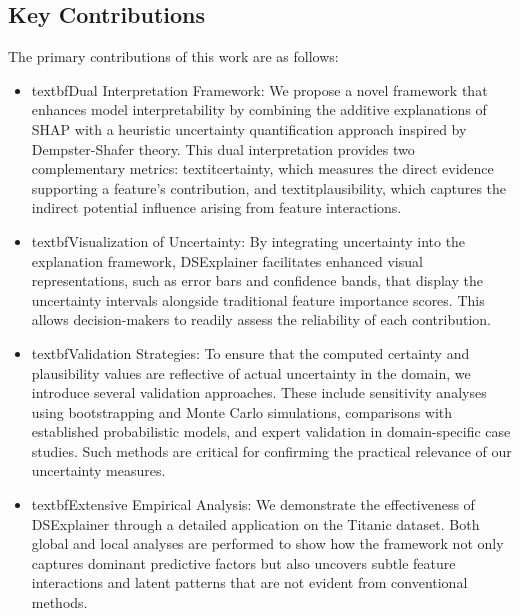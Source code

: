 \documentclass[acmlarge]{acmart}
\begin{document}
\subsection{Key Contributions}
The primary contributions of this work are as follows:
\begin{itemize}
    \item textbf{Dual Interpretation Framework:} We propose a novel framework that enhances model interpretability by combining the additive explanations of SHAP with a heuristic uncertainty quantification approach inspired by Dempster-Shafer theory. This dual interpretation provides two complementary metrics: textit{certainty}, which measures the direct evidence supporting a feature's contribution, and textit{plausibility}, which captures the indirect potential influence arising from feature interactions.

    \item textbf{Visualization of Uncertainty:} By integrating uncertainty into the explanation framework, DSExplainer facilitates enhanced visual representations, such as error bars and confidence bands, that display the uncertainty intervals alongside traditional feature importance scores. This allows decision-makers to readily assess the reliability of each contribution.
    \item textbf{Validation Strategies:} To ensure that the computed certainty and plausibility values are reflective of actual uncertainty in the domain, we introduce several validation approaches. These include sensitivity analyses using bootstrapping and Monte Carlo simulations, comparisons with established probabilistic models, and expert validation in domain-specific case studies. Such methods are critical for confirming the practical relevance of our uncertainty measures.
    \item textbf{Extensive Empirical Analysis:} We demonstrate the effectiveness of DSExplainer through a detailed application on the Titanic dataset. Both global and local analyses are performed to show how the framework not only captures dominant predictive factors but also uncovers subtle feature interactions and latent patterns that are not evident from conventional methods.
\end{itemize}
\end{document}
